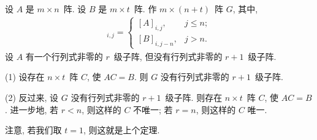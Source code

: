 \documentclass[../libro.tex]{subfiles}
\begin{document}
\begin{theorem}
    设 \(A\) 是 \(m \times n\)~阵.
    设 \(B\) 是 \(m \times t\)~阵.
    作 \(m \times (n + t)\)~阵 \(G\), 其中,
    \begin{align*}
        [G]_{i,j} =
        \begin{cases}
            [A]_{i,j},   & j \leq n; \\
            [B]_{i,j-n}, & j > n.
        \end{cases}
    \end{align*}
    设
    \(A\) 有一个行列式非零的 \(r\)~级子阵,
    但没有行列式非零的 \(r+1\)~级子阵.

    (1)
    设存在 \(n \times t\)~阵 \(C\), 使 \(A C = B\).
    则 \(G\) 没有行列式非零的 \(r+1\)~级子阵.

    (2)
    反过来, 设 \(G\) 没有行列式非零的 \(r+1\)~级子阵.
    则存在 \(n \times t\)~阵 \(C\), 使 \(A C = B\).
    进一步地, 若 \(r < n\), 则这样的 \(C\) 不唯一;
    若 \(r = n\), 则这样的 \(C\) 唯一.
\end{theorem}

注意, 若我们取 \(t = 1\), 则这就是上个定理.
\end{document}
